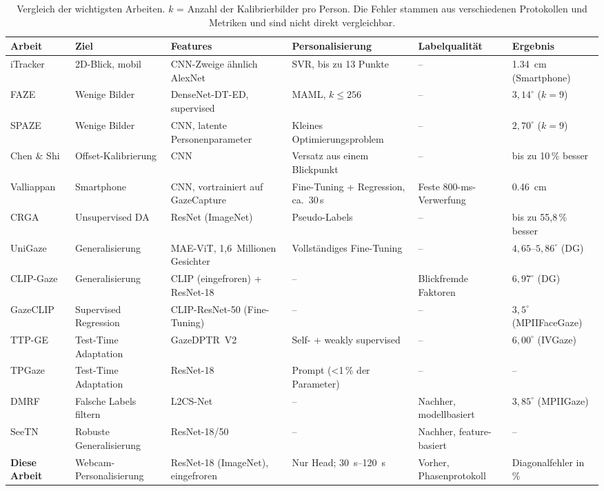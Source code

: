\begin{table}[htbp]
  \centering
  \footnotesize
  \setlength{\tabcolsep}{3pt}
  \caption[Vergleich der wichtigsten Arbeiten]{Vergleich der wichtigsten Arbeiten. $k$ = Anzahl der Kalibrierbilder pro Person. Die Fehler stammen aus verschiedenen Protokollen und Metriken und sind nicht direkt vergleichbar.}
  \label{tab:sota_vergleich}
  \begin{tabularx}{\textwidth}{L{2.3cm} L{2.4cm} L{2.6cm} L{2.6cm} Y L{1.9cm}}
    \toprule
    \textbf{Arbeit} & \textbf{Ziel} & \textbf{Features} & \textbf{Personalisierung} & \textbf{Labelqualität} & \textbf{Ergebnis} \\
    \midrule
    iTracker~\cite{krafka2016itracker} & 2D-Blick, mobil & CNN-Zweige ähnlich AlexNet & SVR, bis zu 13 Punkte & -- & \SI{1,34}{\centi\metre} (Smartphone) \\
    FAZE~\cite{park2019faze} & Wenige Bilder & DenseNet-DT-ED, supervised & MAML, $k \le 256$ & -- & $3,14^\circ$ ($k=9$) \\
    SPAZE~\cite{linden2019spaze} & Wenige Bilder & CNN, latente Personenparameter & Kleines Optimierungsproblem & -- & $2,70^\circ$ ($k=9$) \\
    Chen \& Shi~\cite{chen2020offset} & Offset-Kalibrierung & CNN & Versatz aus einem Blickpunkt & -- & bis zu 10\,\% besser \\
    Valliappan~\cite{valliappan2020smartphone} & Smartphone & CNN, vortrainiert auf GazeCapture & Fine-Tuning + Regression, ca.\ 30\,s & Feste 800-ms-Verwerfung & \SI{0,46}{\centi\metre} \\
    CRGA~\cite{wang2022crga} & Unsupervised DA & ResNet (ImageNet) & Pseudo-Labels & -- & bis zu 55,8\,\% besser \\
    UniGaze~\cite{qin2026unigaze} & Generalisierung & MAE-ViT, 1,6~Millionen Gesichter & Vollständiges Fine-Tuning & -- & $4,65$--$5,86^\circ$ (DG) \\
    CLIP-Gaze~\cite{yin2024clipgaze} & Generalisierung & CLIP (eingefroren) + ResNet-18 & -- & Blickfremde Faktoren & $6,97^\circ$ (DG) \\
    GazeCLIP~\cite{wang2026gazeclip} & Supervised Regression & CLIP-ResNet-50 (Fine-Tuning) & -- & -- & $3,5^\circ$ (MPIIFaceGaze) \\
    TTP-GE~\cite{nagpure2025ttpge} & Test-Time Adaptation & GazeDPTR~V2 & Self- + weakly supervised & -- & $6,00^\circ$ (IVGaze) \\
    TPGaze~\cite{liu2024tpgaze} & Test-Time Adaptation & ResNet-18 & Prompt (<1\,\% der Parameter) & -- & -- \\
    DMRF~\cite{jiang2026dmrf} & Falsche Labels filtern & L2CS-Net & -- & Nachher, modellbasiert & $3,85^\circ$ (MPIIGaze) \\
    SeeTN~\cite{peng2026seetn} & Robuste Generalisierung & ResNet-18/50 & -- & Nachher, feature-basiert & -- \\
    \midrule
    \textbf{Diese Arbeit} & Webcam-Personalisierung & ResNet-18 (ImageNet), eingefroren & Nur Head; \SIrange{30}{120}{\second} & Vorher, Phasenprotokoll & Diagonalfehler in \% \\
    \bottomrule
  \end{tabularx}
\end{table}

